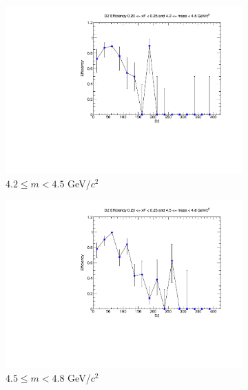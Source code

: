 \documentclass[11pt]{article}
\begin{document}
\begin{figure}[p]
    \centering
    \begin{subfigure}[b]{0.32\textwidth}
        \centering
        \includegraphics[width=\textwidth]{./kTrackerEfficiencyPlots/D2_Efficiency_xF4_mass0.pdf}
        \caption{$4.2 \leq m < 4.5$ GeV/$c^2$}
    \end{subfigure}\hfill
    \begin{subfigure}[b]{0.32\textwidth}
        \centering
        \includegraphics[width=\textwidth]{./kTrackerEfficiencyPlots/D2_Efficiency_xF4_mass1.pdf}
        \caption{$4.5 \leq m < 4.8$ GeV/$c^2$}
    \end{subfigure}\hfill
    \begin{subfigure}[b]{0.32\textwidth}
        \centering

\end{subfigure}
\end{figure}
\end{document}
